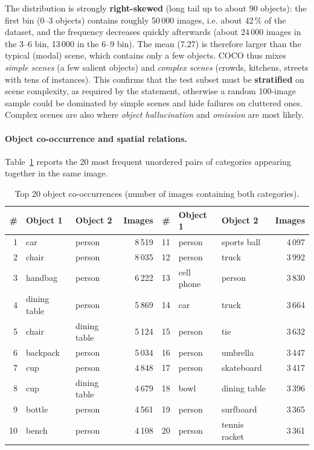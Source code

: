 \documentclass[11pt,a4paper]{article}
\renewcommand{\_}{\textunderscore\allowbreak{}}
\begin{document}
\begin{interp}
The distribution is strongly \textbf{right-skewed} (long tail up to about 90 objects): the first bin (0--3 objects) contains roughly 50\,000 images, i.e. about 42\,\% of the dataset, and the frequency decreases quickly afterwards (about 24\,000 images in the 3--6 bin, 13\,000 in the 6--9 bin). The mean (7.27) is therefore larger than the typical (modal) scene, which contains only a few objects. COCO thus mixes \emph{simple scenes} (a few salient objects) and \emph{complex scenes} (crowds, kitchens, streets with tens of instances). This confirms that the test subset must be \textbf{stratified} on scene complexity, as required by the statement, otherwise a random 100-image sample could be dominated by simple scenes and hide failures on cluttered ones. Complex scenes are also where \emph{object hallucination} and \emph{omission} are most likely.
\end{interp}

\paragraph{Object co-occurrence and spatial relations.} Table~\ref{tab:cooc} reports the 20 most frequent unordered pairs of categories appearing together in the same image.

\begin{table}[H]
\centering
\small
\begin{tabular}{@{}rllr@{\hspace{1.2cm}}rllr@{}}
\toprule
\# & \textbf{Object 1} & \textbf{Object 2} & \textbf{Images} & \# & \textbf{Object 1} & \textbf{Object 2} & \textbf{Images}\\
\midrule
1 & car & person & 8\,519 & 11 & person & sports ball & 4\,097\\
2 & chair & person & 8\,035 & 12 & person & truck & 3\,992\\
3 & handbag & person & 6\,222 & 13 & cell phone & person & 3\,830\\
4 & dining table & person & 5\,869 & 14 & car & truck & 3\,664\\
5 & chair & dining table & 5\,124 & 15 & person & tie & 3\,632\\
6 & backpack & person & 5\,034 & 16 & person & umbrella & 3\,447\\
7 & cup & person & 4\,848 & 17 & person & skateboard & 3\,417\\
8 & cup & dining table & 4\,679 & 18 & bowl & dining table & 3\,396\\
9 & bottle & person & 4\,561 & 19 & person & surfboard & 3\,365\\
10 & bench & person & 4\,108 & 20 & person & tennis racket & 3\,361\\
\bottomrule
\end{tabular}
\caption{Top 20 object co-occurrences (number of images containing both categories).}
\label{tab:cooc}
\end{table}
\end{document}
